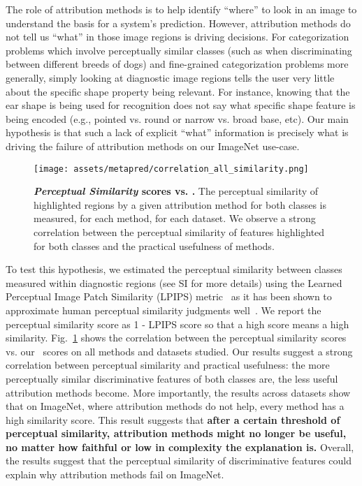 The role of attribution methods is to  help identify ``where'' to look in an image to understand the basis for a system's prediction. However, attribution methods do not tell us ``what'' in those image regions is driving decisions. For categorization problems which involve perceptually similar classes (such as when discriminating between different breeds of dogs) and fine-grained categorization problems more generally, simply looking at diagnostic image regions tells the user very little about the specific shape property being relevant. For instance, knowing that the ear shape is being used for recognition does not say what specific shape feature is being encoded (e.g., pointed vs. round or narrow vs. broad base, etc). Our main hypothesis is that such a lack of explicit ``what'' information is precisely what is driving the failure of attribution methods on our ImageNet use-case.
\begin{figure}[ht]
    \centering
    \texttt{[image: assets/metapred/correlation\_all\_similarity.png]}
    \caption{\textbf{\textit{Perceptual Similarity} scores vs. \metric.} The perceptual similarity of highlighted regions by a given attribution method for both classes is measured, for each method, for each dataset. We observe a strong correlation between the perceptual similarity of features highlighted for both classes and the practical usefulness of methods.
    }
    \label{fig:metapred:similarity}
\end{figure}

To test this hypothesis, we estimated the perceptual similarity between classes measured within diagnostic regions (see SI for more details) using the Learned Perceptual Image Patch Similarity (LPIPS) metric~\cite{zhang2018unreasonable} as it has been shown to approximate human perceptual similarity judgments well~\cite{zhang2018unreasonable, nanda2021exploring}. We report the perceptual similarity score as 1 - LPIPS score so that a high score means a high similarity.
Fig.~\ref{fig:metapred:similarity} shows the correlation between the perceptual similarity scores vs. our \metric~scores on all methods and datasets studied. Our results suggest a strong correlation  between perceptual similarity and practical usefulness: the more perceptually similar discriminative features of both classes are, the less useful attribution methods become. More importantly, the results across datasets show that on ImageNet, where attribution methods do not help, every method has a high similarity score. This result suggests that \textbf{after a certain threshold of perceptual similarity, attribution methods might no longer be useful, no matter how faithful or low in complexity the explanation is.} 
Overall, the results suggest that the perceptual similarity of discriminative features could explain why attribution methods fail on ImageNet.

